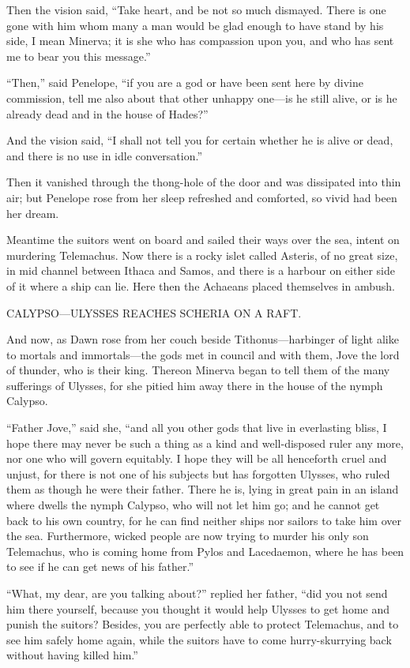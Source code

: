 Then the vision said, “Take heart, and be not so much dismayed. There is one
gone with him whom many a man would be glad enough to have stand by his side, I
mean Minerva; it is she who has compassion upon you, and who has sent me to
bear you this message.”

“Then,” said Penelope, “if you are a god or have been sent here by divine
commission, tell me also about that other unhappy one—is he still alive, or is
he already dead and in the house of Hades?”

And the vision said, “I shall not tell you for certain whether he is alive or
dead, and there is no use in idle conversation.”

Then it vanished through the thong-hole of the door and was dissipated into
thin air; but Penelope rose from her sleep refreshed and comforted, so vivid
had been her dream.

Meantime the suitors went on board and sailed their ways over the sea, intent
on murdering Telemachus. Now there is a rocky islet called Asteris, of no great
size, in mid channel between Ithaca and Samos, and there is a harbour on either
side of it where a ship can lie. Here then the Achaeans placed themselves in
ambush.


CALYPSO—ULYSSES REACHES SCHERIA ON A RAFT.

And now, as Dawn rose from her couch beside Tithonus—harbinger of light alike
to mortals and immortals—the gods met in council and with them, Jove the lord
of thunder, who is their king. Thereon Minerva began to tell them of the many
sufferings of Ulysses, for she pitied him away there in the house of the nymph
Calypso.

“Father Jove,” said she, “and all you other gods that live in everlasting
bliss, I hope there may never be such a thing as a kind and well-disposed ruler
any more, nor one who will govern equitably. I hope they will be all henceforth
cruel and unjust, for there is not one of his subjects but has forgotten
Ulysses, who ruled them as though he were their father. There he is, lying in
great pain in an island where dwells the nymph Calypso, who will not let him
go; and he cannot get back to his own country, for he can find neither ships
nor sailors to take him over the sea. Furthermore, wicked people are now trying
to murder his only son Telemachus, who is coming home from Pylos and
Lacedaemon, where he has been to see if he can get news of his father.”

“What, my dear, are you talking about?” replied her father, “did you not send
him there yourself, because you thought it would help Ulysses to get home and
punish the suitors? Besides, you are perfectly able to protect Telemachus, and
to see him safely home again, while the suitors have to come hurry-skurrying
back without having killed him.”

